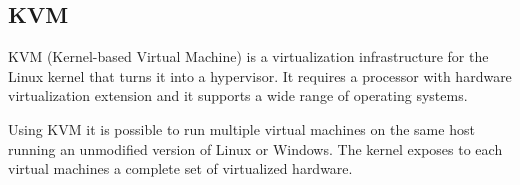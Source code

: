 \subsection{KVM}

KVM (Kernel-based Virtual Machine) \cite{KVMWebsite} is a virtualization
infrastructure for the Linux kernel that turns it into a hypervisor. It
requires a processor with hardware virtualization extension and it
supports a wide range of operating systems.

Using KVM it is possible to run multiple virtual machines on the same host
running an unmodified version of Linux or Windows. The kernel exposes to
each virtual machines a complete set of virtualized hardware.

